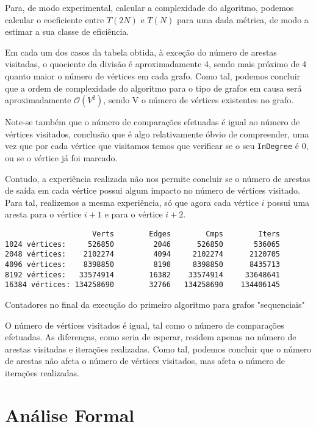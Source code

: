 Para, de modo experimental, calcular a complexidade do algoritmo,
podemos calcular o coeficiente entre $T(2N)$ e $T(N)$ para uma dada métrica, de modo a
estimar a sua classe de eficiência.

Em cada um dos casos da tabela obtida, à exceção do número de arestas 
visitadas, o quociente da divisão é aproximadamente 4, 
sendo mais próximo de 4 quanto maior o número de vértices em cada 
grafo. Como tal, podemos concluir que
a ordem de complexidade do algoritmo para o tipo de grafos em
causa será aproximadamente $\mathcal{O}(V^2)$, sendo V o número de vértices existentes no grafo.

Note-se também que o número de comparações efetuadas é igual ao
número de vértices visitados, conclusão que é algo relativamente
óbvio de compreender, uma vez que por cada vértice que visitamos
temos que verificar se o seu \verb|InDegree| é 0, ou se o vértice
já foi marcado.

Contudo, a experiência realizada não nos permite concluir se o
número de arestas de saída em cada vértice possui algum impacto
no número de vértices visitado. Para tal, realizemos a mesma
experiência, só que agora cada vértice $i$ possui uma aresta para
o vértice $i + 1$ e para o vértice $i + 2$.

\begin{listing}[H]
	\centering
	\begin{verbatim}
                    Verts	     Edges	      Cmps        Iters
1024 vértices:     526850	      2046	    526850       536065
2048 vértices:    2102274	      4094	   2102274      2120705
4096 vértices:    8398850	      8190	   8398850      8435713
8192 vértices:   33574914	     16382	  33574914     33648641
16384 vértices: 134258690	     32766	 134258690    134406145
  \end{verbatim}
	\caption{Contadores no final da execução do primeiro algoritmo
		para grafos "sequenciais"}
  \label{1-3}
\end{listing}

O número de vértices visitados é igual, tal como o número de
comparações efetuadas. As diferenças, como seria de esperar, residem
apenas no número de arestas visitadas e iterações realizadas.
Como tal, podemos concluir que o número de arestas não afeta o número de vértices visitados, mas afeta o número de
iterações realizadas.

\section{Análise Formal}

